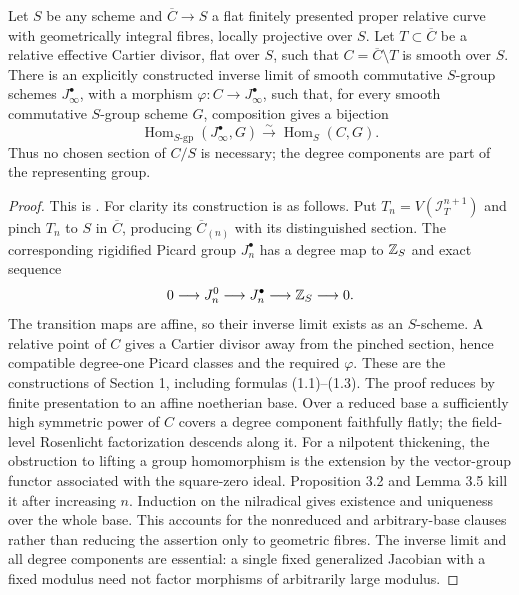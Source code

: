 \begin{theorem}\label{thm:B3-rosenlicht}
Let $S$ be any scheme and $\overline C\to S$ a flat finitely
presented proper relative curve with geometrically integral fibres,
locally projective over $S$. Let $T\subset\overline C$ be a relative
effective Cartier divisor, flat over $S$, such that
$C=\overline C\setminus T$ is smooth over $S$.
There is an explicitly constructed inverse limit of smooth
commutative $S$-group schemes $J^\bullet_\infty$, with a morphism
$\varphi:C\to J^\bullet_\infty$, such that, for every smooth
commutative $S$-group scheme $G$, composition gives a bijection
\[
 \operatorname{Hom}_{S\text{-}\mathrm{gp}}(J^\bullet_\infty,G)
 \xrightarrow{\sim}\operatorname{Hom}_S(C,G).
\]
Thus no chosen section of $C/S$ is necessary; the degree components
are part of the representing group.
\end{theorem}
\begin{proof}
This is \cite[Theorem 1.4, p.~204, with hypotheses in Section 0,
p.~203]{BContou1979}. For clarity its construction is as follows.
Put $T_n=V(\mathcal I_T^{n+1})$ and pinch $T_n$ to $S$ in
$\overline C$, producing $\overline C_{(n)}$ with its distinguished
section. The corresponding rigidified Picard group $J^\bullet_n$
has a degree map to ${\mathbb{Z}}_S$ and exact sequence
\[
 0\longrightarrow J^0_n\longrightarrow J^\bullet_n
 \longrightarrow{\ensuremath{\mathbb{Z}}}_S\longrightarrow0.
\]
The transition maps are affine, so their inverse limit exists as an
$S$-scheme. A relative point of $C$ gives a Cartier divisor away
from the pinched section, hence compatible degree-one Picard classes
and the required $\varphi$. These are the constructions of Section 1,
including formulas (1.1)--(1.3).
The proof reduces by finite presentation to an affine noetherian
base. Over a reduced base a sufficiently high symmetric power of
$C$ covers a degree component faithfully flatly; the field-level
Rosenlicht factorization descends along it. For a nilpotent
thickening, the obstruction to lifting a group homomorphism is the
extension by the vector-group functor associated with the square-zero
ideal. Proposition 3.2 and Lemma 3.5 kill it after increasing $n$.
Induction on the nilradical gives existence and uniqueness over the
whole base. This accounts for the nonreduced and arbitrary-base
clauses rather than reducing the assertion only to geometric fibres.
The inverse limit and all degree components are essential: a single
fixed generalized Jacobian with a fixed modulus need not factor
morphisms of arbitrarily large modulus.
\end{proof}

